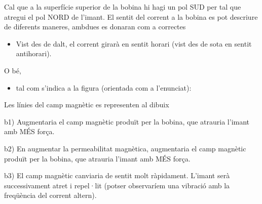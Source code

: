 \begin{solapartat}
Cal que a la superfície superior de la bobina hi hagi un pol SUD  per tal que atregui el pol NORD de l'imant. El sentit del corrent a la bobina es pot descriure de diferents maneres, ambdues es donaran com a correctes

\begin{minipage}[c]{0.66\linewidth}
\begin{itemize}
  \item[$\checkmark$] Vist des de dalt, el corrent girarà en sentit horari (vist des de sota en sentit antihorari).
\end{itemize}
\end{minipage}\hfill
\begin{minipage}[c]{0.14\linewidth}
\end{minipage}\hfill
\begin{minipage}[c]{0.14\linewidth}
\end{minipage}

O bé,

\begin{minipage}[c]{0.66\linewidth}
\begin{itemize}
  \item[$\checkmark$] tal com s'indica a la figura (orientada com a l'enunciat):
\end{itemize}
\end{minipage}\hfill
\begin{minipage}[c]{0.3\linewidth}
\end{minipage}

\begin{minipage}[c]{0.66\linewidth}
 Les línies del camp magnètic es representen al dibuix
\end{minipage}\hfill
\begin{minipage}[c]{0.3\linewidth}
\end{minipage}
\end{solapartat}

\begin{solapartat}
 b1) Augmentaria el camp magnètic produït per la bobina, que atrauria l'imant amb MÉS força.

 b2) En augmentar la permeabilitat magnètica, augmentaria el camp magnètic produït per la bobina, que atrauria l'imant amb MÉS força.

 b3) El camp magnètic canviaria de sentit molt ràpidament. L'imant serà successivament atret i repel·lit (potser observaríem una vibració amb la freqüència del corrent altern).
\end{solapartat}
